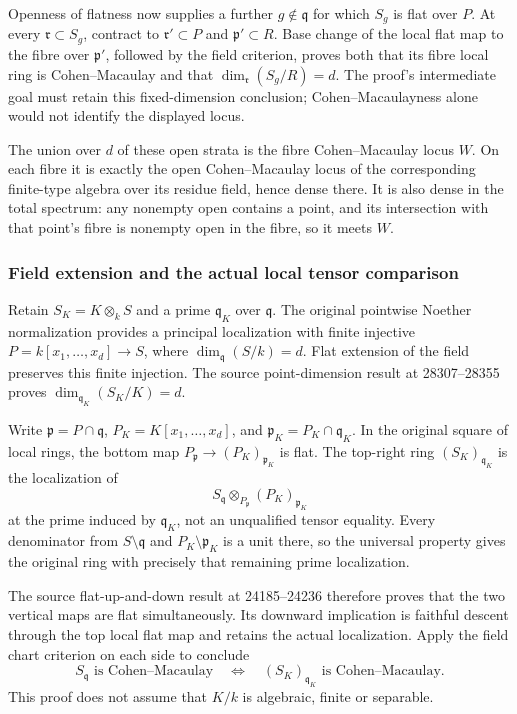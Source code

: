 Openness of flatness now supplies a further \(g\notin\mathfrak q\) for which \(S_g\) is flat over \(P\). At every \(\mathfrak r\subset S_g\), contract to \(\mathfrak r'\subset P\) and \(\mathfrak p'\subset R\). Base change of the local flat map to the fibre over \(\mathfrak p'\), followed by the field criterion, proves both that its fibre local ring is Cohen--Macaulay and that \(\dim_{\mathfrak r}(S_g/R)=d\). The proof's intermediate goal must retain this fixed-dimension conclusion; Cohen--Macaulayness alone would not identify the displayed locus.

The union over \(d\) of these open strata is the fibre Cohen--Macaulay locus \(W\). On each fibre it is exactly the open Cohen--Macaulay locus of the corresponding finite-type algebra over its residue field, hence dense there. It is also dense in the total spectrum: any nonempty open contains a point, and its intersection with that point's fibre is nonempty open in the fibre, so it meets \(W\).

\subsubsection{Field extension and the actual local tensor comparison}\label{algebra-proof-040-field-extension-and-the-actual-local-tensor-comparison}

Retain \(S_K=K\otimes_k S\) and a prime \(\mathfrak q_K\) over \(\mathfrak q\). The original pointwise Noether normalization provides a principal localization with finite injective \(P=k[x_1,\ldots,x_d]\to S\), where \(\dim_{\mathfrak q}(S/k)=d\). Flat extension of the field preserves this finite injection. The source point-dimension result at 28307--28355 proves \(\dim_{\mathfrak q_K}(S_K/K)=d\).

Write \(\mathfrak p=P\cap\mathfrak q\), \(P_K=K[x_1,\ldots,x_d]\), and \(\mathfrak p_K=P_K\cap\mathfrak q_K\). In the original square of local rings, the bottom map \(P_{\mathfrak p}\to(P_K)_{\mathfrak p_K}\) is flat. The top-right ring \((S_K)_{\mathfrak q_K}\) is the localization of \[
S_{\mathfrak q}\otimes_{P_{\mathfrak p}}(P_K)_{\mathfrak p_K}
\] at the prime induced by \(\mathfrak q_K\), not an unqualified tensor equality. Every denominator from \(S\setminus\mathfrak q\) and \(P_K\setminus\mathfrak p_K\) is a unit there, so the universal property gives the original ring with precisely that remaining prime localization.

The source flat-up-and-down result at 24185--24236 therefore proves that the two vertical maps are flat simultaneously. Its downward implication is faithful descent through the top local flat map and retains the actual localization. Apply the field chart criterion on each side to conclude \[
S_{\mathfrak q}\text{ is Cohen–Macaulay}
\quad\Longleftrightarrow\quad
(S_K)_{\mathfrak q_K}\text{ is Cohen–Macaulay}.
\] This proof does not assume that \(K/k\) is algebraic, finite or separable.

